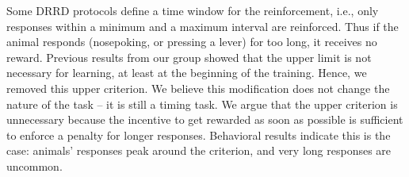         Some DRRD protocols define a time window for the reinforcement, i.e., only responses within a minimum and a maximum interval are reinforced. Thus if the animal responds (nosepoking, or pressing a lever) for too long, it receives no reward. Previous results from our group showed that the upper limit is not necessary for learning, at least at the beginning of the training. Hence, we removed this upper criterion. We believe this modification does not change the nature of the task -- it is still a timing task. We argue that the upper criterion is unnecessary because the incentive to get rewarded as soon as possible is sufficient to enforce a penalty for longer responses. Behavioral results indicate this is the case: animals' responses peak around the criterion, and very long responses are uncommon.